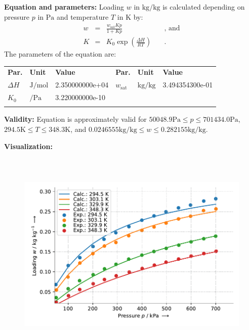 \textbf{Equation and parameters:}
\newline
%
Loading $w$ in $\si{\kilogram\per\kilogram}$ is calculated depending on pressure $p$ in $\si{\pascal}$ and temperature $T$ in $\si{\kelvin}$ by:
%
\begin{equation*}
\begin{split}
w &=& \frac{w_\mathrm{sat} K p}{1 + K p} & \quad\text{, and} \\
K &=& K_0 \exp \left( \frac{\Delta H}{R T} \right) & \quad\text{.}
\end{split}
\end{equation*}
%
The parameters of the equation are:
%
\begin{longtable}[l]{lll|lll}
\toprule
\addlinespace
\textbf{Par.} & \textbf{Unit} & \textbf{Value} &	\textbf{Par.} & \textbf{Unit} & \textbf{Value} \\
\addlinespace
\midrule
\endhead

\bottomrule
\endfoot
\bottomrule
\endlastfoot
\addlinespace

$\Delta H$ & $\si{\joule\per\mole}$ & 2.350000000e+04 & $w_\mathrm{sat}$ & $\si{\kilogram\per\kilogram}$ & 3.494354300e-01 \\
$K_0$ & $\si{\per\pascal}$ & 3.220000000e-10 & & & \\

\addlinespace\end{longtable}

\textbf{Validity:}
\newline
Equation is approximately valid for $50048.9 \si{\pascal} \leq p \leq 701434.0 \si{\pascal}$,  $294.5 \si{\kelvin} \leq T \leq 348.3 \si{\kelvin}$, and $0.0246555 \si{\kilogram\per\kilogram} \leq w \leq 0.282155 \si{\kilogram\per\kilogram}$.
\newline

\textbf{Visualization:}
%
\begin{figure}[!htp]
{\noindent\includegraphics[height=10cm, keepaspectratio]{figs/ads/ads_CarbonDioxide_activated_carbon_Norit_RB_1_Langmuir_1.pdf}}
\end{figure}
%

